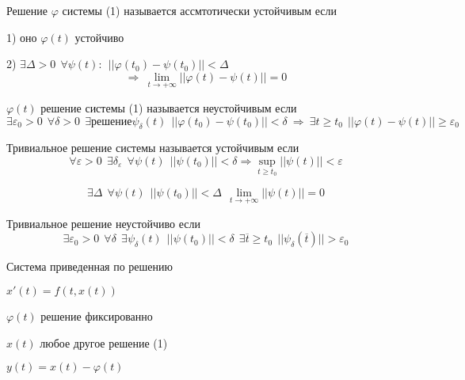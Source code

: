 \begin{define}
  Решение $\varphi$ системы (1) называется ассмтотически устойчивым если

  1) оно $\varphi(t)$ устойчиво

  2) $\exists \Delta > 0 ~~ \forall \psi(t): ~~ || \varphi(t_0) - \psi(t_0)||
  < \Delta$
  $$
  \Rightarrow ~ \lim_{t \to +\infty} ||\varphi(t) - \psi(t)|| = 0
  $$
\end{define}


\begin{define}
  $\varphi(t)$ решение системы (1) называется неустойчивым если
  $$
  \exists \varepsilon_0 > 0 ~~ \forall \delta > 0 ~~ \exists \text{решение}
  \psi_{\delta}(t) ~~ ||\varphi(t_0) - \psi(t_0)|| < \delta ~ \Rightarrow ~
  \exists t \ge t_0 ~~ || \varphi(t) - \psi(t)|| \ge \varepsilon_0
  $$
\end{define}

\begin{define}
  Тривиальное решение системы называется устойчивым если
  $$
  \forall \varepsilon > 0 ~~ \exists \delta_{\varepsilon} ~~ \forall \psi(t) ~~
  ||\psi(t_0)|| < \delta \Rightarrow \sup_{t \ge t_0} ||\psi(t)|| < \varepsilon
  $$
\end{define}

\begin{define}
  $$
  \exists \Delta ~~ \forall \psi(t) ~~ ||\psi(t_0)|| < \Delta ~~
  \lim_{t \to + \infty} ||\psi(t)|| = 0
  $$
\end{define}

\begin{define}
  Тривиальное решение неустойчиво если
  $$
  \exists \varepsilon_0 > 0 ~~ \forall \delta ~~ \exists \psi_{\delta}(t) ~~
  ||\psi(t_0)|| < \delta ~~ \exists \overline{t} \ge t_0 ~~
  ||\psi_{\delta}(\overline{t})|| > \varepsilon_0
  $$
\end{define}

\begin{title}[\Large]
  Система приведенная по решению
\end{title}

$x'(t) = f(t, x(t))$

$\varphi(t)$ решение фиксированно

$x(t)$ любое другое решение (1)

$y(t) = x(t) - \varphi(t)$

